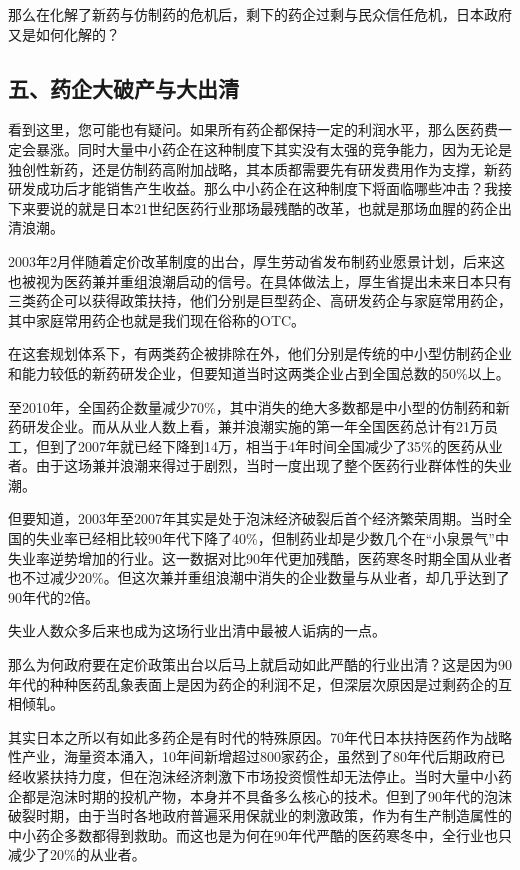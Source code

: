那么在化解了新药与仿制药的危机后，剩下的药企过剩与民众信任危机，日本政府又是如何化解的？

\subsection{五、药企大破产与大出清}

看到这里，您可能也有疑问。如果所有药企都保持一定的利润水平，那么医药费一定会暴涨。同时大量中小药企在这种制度下其实没有太强的竞争能力，因为无论是独创性新药，还是仿制药高附加战略，其本质都需要先有研发费用作为支撑，新药研发成功后才能销售产生收益。那么中小药企在这种制度下将面临哪些冲击？我接下来要说的就是日本21世纪医药行业那场最残酷的改革，也就是那场血腥的药企出清浪潮。

2003年2月伴随着定价改革制度的出台，厚生劳动省发布制药业愿景计划，后来这也被视为医药兼并重组浪潮启动的信号。在具体做法上，厚生省提出未来日本只有三类药企可以获得政策扶持，他们分别是巨型药企、高研发药企与家庭常用药企，其中家庭常用药企也就是我们现在俗称的OTC。

在这套规划体系下，有两类药企被排除在外，他们分别是传统的中小型仿制药企业和能力较低的新药研发企业，但要知道当时这两类企业占到全国总数的50\%以上。

至2010年，全国药企数量减少70\%，其中消失的绝大多数都是中小型的仿制药和新药研发企业。而从从业人数上看，兼并浪潮实施的第一年全国医药总计有21万员工，但到了2007年就已经下降到14万，相当于4年时间全国减少了35\%的医药从业者。由于这场兼并浪潮来得过于剧烈，当时一度出现了整个医药行业群体性的失业潮。

但要知道，2003年至2007年其实是处于泡沫经济破裂后首个经济繁荣周期。当时全国的失业率已经相比较90年代下降了40\%，但制药业却是少数几个在“小泉景气”中失业率逆势增加的行业。这一数据对比90年代更加残酷，医药寒冬时期全国从业者也不过减少20\%。但这次兼并重组浪潮中消失的企业数量与从业者，却几乎达到了90年代的2倍。

失业人数众多后来也成为这场行业出清中最被人诟病的一点。

那么为何政府要在定价政策出台以后马上就启动如此严酷的行业出清？这是因为90年代的种种医药乱象表面上是因为药企的利润不足，但深层次原因是过剩药企的互相倾轧。

其实日本之所以有如此多药企是有时代的特殊原因。70年代日本扶持医药作为战略性产业，海量资本涌入，10年间新增超过800家药企，虽然到了80年代后期政府已经收紧扶持力度，但在泡沫经济刺激下市场投资惯性却无法停止。当时大量中小药企都是泡沫时期的投机产物，本身并不具备多么核心的技术。但到了90年代的泡沫破裂时期，由于当时各地政府普遍采用保就业的刺激政策，作为有生产制造属性的中小药企多数都得到救助。而这也是为何在90年代严酷的医药寒冬中，全行业也只减少了20\%的从业者。


